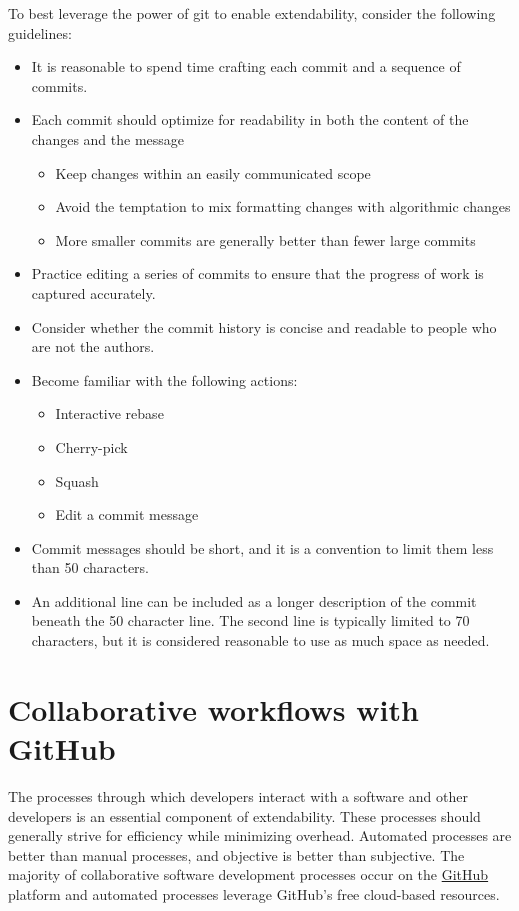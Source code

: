 \documentclass[]{nrel}
\begin{document}
To best leverage the power of git to enable extendability, consider the following guidelines:
\begin{itemize}
\item It is reasonable to spend time crafting each commit and a sequence of commits.
\item Each commit should optimize for readability in both the content of the changes and the message
\begin{itemize}
    \item Keep changes within an easily communicated scope
    \item Avoid the temptation to mix formatting changes with algorithmic changes
    \item More smaller commits are generally better than fewer large commits
\end{itemize}
\item Practice editing a series of commits to ensure that the progress of work is captured accurately.
\item Consider whether the commit history is concise and readable to people who are not the authors.
\item Become familiar with the following actions:
\begin{itemize}
    \item Interactive rebase
    \item Cherry-pick
    \item Squash
    \item Edit a commit message
\end{itemize}
\item Commit messages should be short, and it is a convention to limit them less than 50 characters.
\item An additional line can be included as a longer description of the commit beneath the
50 character line. The second line is typically limited to 70 characters, but it is
considered reasonable to use as much space as needed.

\end{itemize}


\section{Collaborative workflows with GitHub}


The processes through which developers interact with a software and other developers is
an essential component of extendability.
These processes should generally strive for efficiency while minimizing overhead.
Automated processes are better than manual processes, and objective is better than subjective.
The majority of collaborative software development processes occur on the
\href{https://github.com}{GitHub} platform and automated processes leverage GitHub's free
cloud-based resources.
\end{document}
